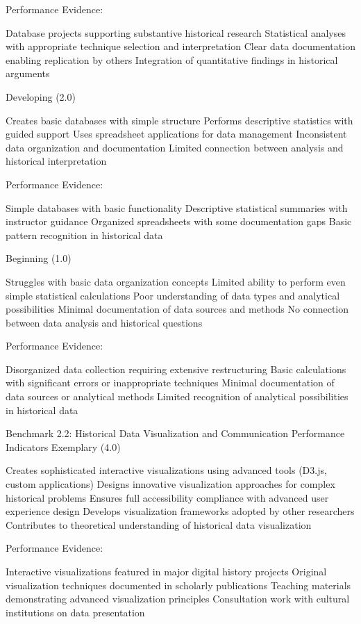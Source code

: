 \begin{appendices}
Performance Evidence:

Database projects supporting substantive historical research
Statistical analyses with appropriate technique selection and interpretation
Clear data documentation enabling replication by others
Integration of quantitative findings in historical arguments

Developing (2.0)

Creates basic databases with simple structure
Performs descriptive statistics with guided support
Uses spreadsheet applications for data management
Inconsistent data organization and documentation
Limited connection between analysis and historical interpretation

Performance Evidence:

Simple databases with basic functionality
Descriptive statistical summaries with instructor guidance
Organized spreadsheets with some documentation gaps
Basic pattern recognition in historical data

Beginning (1.0)

Struggles with basic data organization concepts
Limited ability to perform even simple statistical calculations
Poor understanding of data types and analytical possibilities
Minimal documentation of data sources and methods
No connection between data analysis and historical questions

Performance Evidence:

Disorganized data collection requiring extensive restructuring
Basic calculations with significant errors or inappropriate techniques
Minimal documentation of data sources or analytical methods
Limited recognition of analytical possibilities in historical data

Benchmark 2.2: Historical Data Visualization and Communication
Performance Indicators
Exemplary (4.0)

Creates sophisticated interactive visualizations using advanced tools (D3.js, custom applications)
Designs innovative visualization approaches for complex historical problems
Ensures full accessibility compliance with advanced user experience design
Develops visualization frameworks adopted by other researchers
Contributes to theoretical understanding of historical data visualization

Performance Evidence:

Interactive visualizations featured in major digital history projects
Original visualization techniques documented in scholarly publications
Teaching materials demonstrating advanced visualization principles
Consultation work with cultural institutions on data presentation


\end{appendices}
